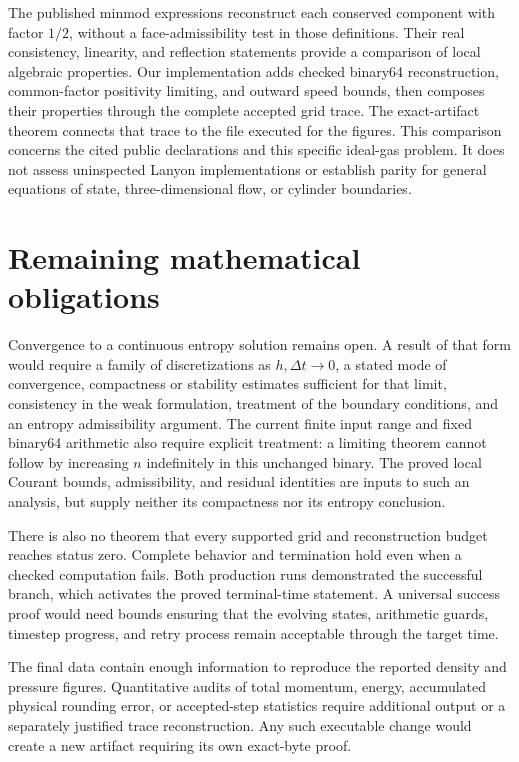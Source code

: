 \documentclass[11pt]{article}
\begin{document}
The published minmod expressions reconstruct each conserved component with factor $1/2$, without a face-admissibility test in those definitions.  Their real consistency, linearity, and reflection statements provide a comparison of local algebraic properties.  Our implementation adds checked binary64 reconstruction, common-factor positivity limiting, and outward speed bounds, then composes their properties through the complete accepted grid trace.  The exact-artifact theorem connects that trace to the file executed for the figures.  This comparison concerns the cited public declarations and this specific ideal-gas problem.  It does not assess uninspected Lanyon implementations or establish parity for general equations of state, three-dimensional flow, or cylinder boundaries.

\section{Remaining mathematical obligations}

Convergence to a continuous entropy solution remains open.  A result of that form would require a family of discretizations as $h,\Delta t\to0$, a stated mode of convergence, compactness or stability estimates sufficient for that limit, consistency in the weak formulation, treatment of the boundary conditions, and an entropy admissibility argument.  The current finite input range and fixed binary64 arithmetic also require explicit treatment: a limiting theorem cannot follow by increasing $n$ indefinitely in this unchanged binary.  The proved local Courant bounds, admissibility, and residual identities are inputs to such an analysis, but supply neither its compactness nor its entropy conclusion.

There is also no theorem that every supported grid and reconstruction budget reaches status zero.  Complete behavior and termination hold even when a checked computation fails.  Both production runs demonstrated the successful branch, which activates the proved terminal-time statement.  A universal success proof would need bounds ensuring that the evolving states, arithmetic guards, timestep progress, and retry process remain acceptable through the target time.

The final data contain enough information to reproduce the reported density and pressure figures.  Quantitative audits of total momentum, energy, accumulated physical rounding error, or accepted-step statistics require additional output or a separately justified trace reconstruction.  Any such executable change would create a new artifact requiring its own exact-byte proof.
\end{document}
